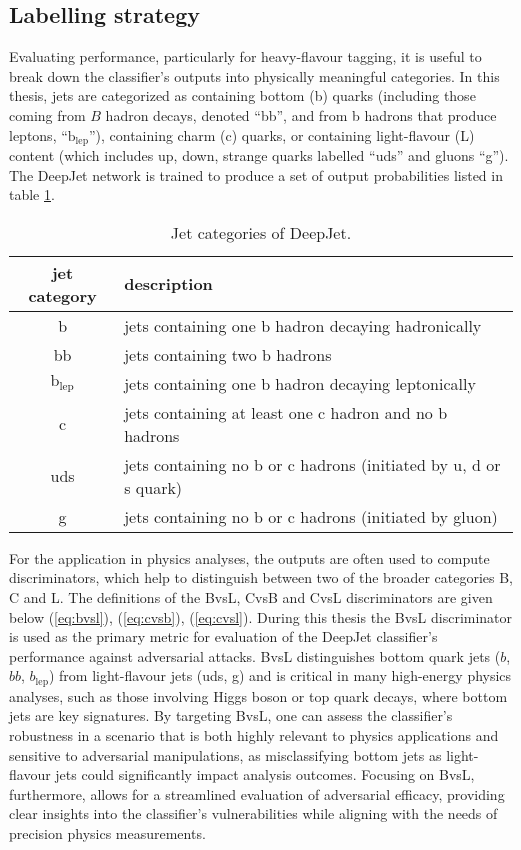 \subsection{Labelling strategy}

Evaluating performance, particularly for heavy-flavour tagging, it is useful to break down the classifier’s outputs into physically meaningful categories. In this thesis, jets are categorized as containing bottom (b) quarks (including those coming from $B$ hadron decays, denoted “bb”, and from b hadrons that produce leptons, “$\text{b}_\text{lep}$”), containing charm (c) quarks, or containing light-flavour (L) content (which includes up, down, strange quarks labelled “uds” and gluons “g”). The DeepJet network is trained to produce a set of output probabilities listed in table \ref{tab:jet_categories}.

\begin{table}[ht]
\centering
\caption{Jet categories of DeepJet.}
\begin{tabular}{|c|l|}
\hline
\textbf{jet category} & \textbf{description} \\
\hline
b & jets containing one b hadron decaying hadronically \\
\hline
bb & jets containing two b hadrons \\
\hline
$\text{b}_{\text{lep}}$ & jets containing one b hadron decaying leptonically \\
\hline
c & jets containing at least one c hadron and no b hadrons \\
\hline
uds & jets containing no b or c hadrons (initiated by u, d or s quark) \\
\hline
g & jets containing no b or c hadrons (initiated by gluon) \\
\hline
\end{tabular}
\label{tab:jet_categories}
\end{table}

For the application in physics analyses, the outputs are often used to compute discriminators, which help to distinguish between two of the broader categories B, C and L. The definitions of the BvsL, CvsB and CvsL discriminators are given below (\ref{eq:bvsl}), (\ref{eq:cvsb}), (\ref{eq:cvsl}). During this thesis the BvsL discriminator is used as the primary metric for evaluation of the DeepJet classifier's performance against adversarial attacks. BvsL distinguishes bottom quark jets ($b$, $bb$, $b_{\text{lep}}$) from light-flavour jets (uds, g) and is critical in many high-energy physics analyses, such as those involving Higgs boson or top quark decays, where bottom jets are key signatures. By targeting BvsL, one can assess the classifier’s robustness in a scenario that is both highly relevant to physics applications and sensitive to adversarial manipulations, as misclassifying bottom jets as light-flavour jets could significantly impact analysis outcomes. Focusing on BvsL, furthermore, allows for a streamlined evaluation of adversarial efficacy, providing clear insights into the classifier’s vulnerabilities while aligning with the needs of precision physics measurements.

